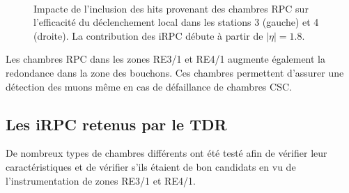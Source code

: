 \begin{itemize}[label=$\bullet$]
	\begin{figure}[ht!]
	 	\centering
	 	\\
	 	\caption{Impacte de l'inclusion des hits provenant des chambres RPC sur l'efficacité du déclenchement local dans les stations \num{3} (gauche) et \num{4} (droite). La contribution des iRPC débute à partir de $|\eta|=\num{1.8}$.}
	 	\label{effii}
	 \end{figure}
	
	Les chambres RPC dans les zones RE3/1 et RE4/1 augmente également la redondance dans la zone des bouchons. Ces chambres permettent d'assurer une détection des muons même en cas de défaillance de chambres CSC.
\end{itemize}

\subsection{Les iRPC retenus par le TDR}
De nombreux types de chambres différents ont été testé afin de vérifier leur caractéristiques et de vérifier s'ils étaient de bon candidats en vu de l'instrumentation de zones RE3/1 et RE4/1.

